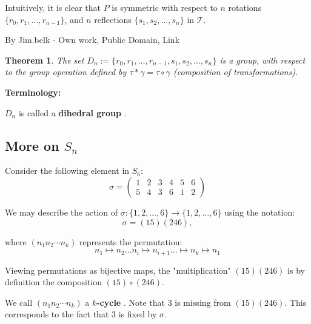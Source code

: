 \documentclass[a4paper,12pt]{report}
\newcommand{\ra}{\longrightarrow}
\newcounter{statement}
\numberwithin{statement}{chapter}
\newtheorem{thm}[statement]{Theorem}
\numberwithin{equation}{chapter}
\numberwithin{section}{chapter}
\numberwithin{subsection}{section}
\begin{document}
Intuitively, it is clear that $P$ is symmetric with respect to $n$ rotations $\{r_0, r_1,\ldots, r_{n - 1}\}$,
and $n$ reflections $\{s_1, s_2,\ldots, s_n\}$ in $\mathcal{T}$.









By Jim.belk - Own work, Public Domain, Link







\begin{thm}

The set $D_n := \{r_0, r_1,\ldots, r_{n - 1}, s_1, s_2,\ldots, s_n\}$ is a group,
with respect to the group operation defined by $\tau*\gamma = \tau\circ\gamma$
(composition of transformations).

\end{thm}
 {\bf Terminology:} 

$D_n$ is called a  {\bf dihedral group} .





\subsection{More on $S_n$}




Consider the following element in $S_6$:
\[
\sigma = \left(
\begin{matrix}
1&2&3&4&5&6\\
5&4&3&6&1&2
\end{matrix}
\right)
\]

We may describe the action of $\sigma : \{1, 2, \ldots, 6\} \ra \{1, 2, \ldots, 6\}$
using the notation:
\[
\sigma = (15)(246),
\]

where $(n_1 n_2\cdots n_k)$ represents the permutation:
\[
n_1 \mapsto n_2 \dots n_i \mapsto n_{i + 1} \dots \mapsto n_k \mapsto n_1
\]

Viewing permutations as bijective maps,
the "multiplication" $(15)(246)$ is by definition the composition $(15)\circ(246)$.




We call $(n_1n_2\cdots n_k)$ a  {\bf $k$-cycle} .
Note that $3$ is missing from $(15)(246)$.
This corresponds to the fact that $3$ is fixed by $\sigma$.
\end{document}
